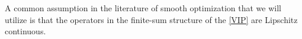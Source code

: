 %

A common assumption in the literature of smooth optimization that we will utilize is that the operators in the finite-sum structure of the \eqref{VIP} are Lipschitz continuous.%


